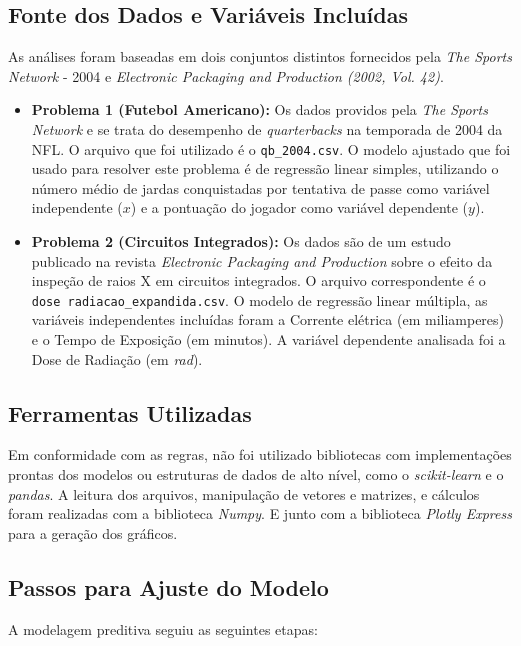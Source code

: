 \documentclass{article}
\begin{document}
\subsection{Fonte dos Dados e Variáveis Incluídas}
As análises foram baseadas em dois conjuntos distintos fornecidos pela \textit{The Sports Network} - 2004 e \textit{Electronic Packaging and Production (2002, Vol. 42)}.
\begin{itemize}
    \item \textbf{Problema 1 (Futebol Americano):} Os dados providos pela \textit{The Sports Network} e se trata do desempenho de \textit{quarterbacks} na temporada de 2004 da NFL. O arquivo que foi utilizado é o \texttt{qb\_2004.csv}. O modelo ajustado que foi usado para resolver este problema é de regressão linear simples, utilizando o número médio de jardas conquistadas por tentativa de passe como variável independente ($x$) e a pontuação do jogador como variável dependente ($y$).
    
    \item \textbf{Problema 2 (Circuitos Integrados):} Os dados são de um estudo publicado na revista \textit{Electronic Packaging and Production} sobre o efeito da inspeção de raios X em circuitos integrados. O arquivo correspondente é o \texttt{dose radiacao\_expandida.csv}. O modelo de regressão linear múltipla, as variáveis independentes incluídas foram a Corrente elétrica (em miliamperes) e o Tempo de Exposição (em minutos). A variável dependente analisada foi a Dose de Radiação (em \textit{rad}).
\end{itemize}

\subsection{Ferramentas Utilizadas}
Em conformidade com as regras, não foi utilizado bibliotecas com implementações prontas dos modelos ou estruturas de dados de alto nível, como o \textit{scikit-learn} e o \textit{pandas}. A leitura dos arquivos, manipulação de vetores e matrizes, e cálculos foram realizadas com a biblioteca \textit{Numpy}. E junto com a biblioteca \textit{Plotly Express} para a geração dos gráficos.

\subsection{Passos para Ajuste do Modelo}
A modelagem preditiva seguiu as seguintes etapas:
\end{document}

